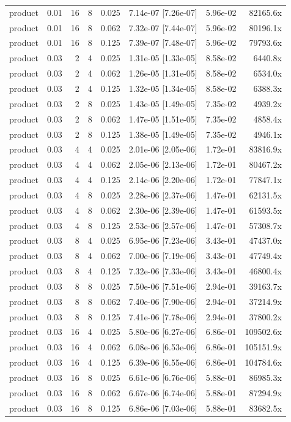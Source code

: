\begin{tabular}{lrrrrrrr}
product & 0.01 & 16 & 8 & 0.025 & 7.14e-07 [7.26e-07] & 5.96e-02 & 82165.6x \\
product & 0.01 & 16 & 8 & 0.062 & 7.32e-07 [7.44e-07] & 5.96e-02 & 80196.1x \\
product & 0.01 & 16 & 8 & 0.125 & 7.39e-07 [7.48e-07] & 5.96e-02 & 79793.6x \\
product & 0.03 & 2 & 4 & 0.025 & 1.31e-05 [1.33e-05] & 8.58e-02 & 6440.8x \\
product & 0.03 & 2 & 4 & 0.062 & 1.26e-05 [1.31e-05] & 8.58e-02 & 6534.0x \\
product & 0.03 & 2 & 4 & 0.125 & 1.32e-05 [1.34e-05] & 8.58e-02 & 6388.3x \\
product & 0.03 & 2 & 8 & 0.025 & 1.43e-05 [1.49e-05] & 7.35e-02 & 4939.2x \\
product & 0.03 & 2 & 8 & 0.062 & 1.47e-05 [1.51e-05] & 7.35e-02 & 4858.4x \\
product & 0.03 & 2 & 8 & 0.125 & 1.38e-05 [1.49e-05] & 7.35e-02 & 4946.1x \\
product & 0.03 & 4 & 4 & 0.025 & 2.01e-06 [2.05e-06] & 1.72e-01 & 83816.9x \\
product & 0.03 & 4 & 4 & 0.062 & 2.05e-06 [2.13e-06] & 1.72e-01 & 80467.2x \\
product & 0.03 & 4 & 4 & 0.125 & 2.14e-06 [2.20e-06] & 1.72e-01 & 77847.1x \\
product & 0.03 & 4 & 8 & 0.025 & 2.28e-06 [2.37e-06] & 1.47e-01 & 62131.5x \\
product & 0.03 & 4 & 8 & 0.062 & 2.30e-06 [2.39e-06] & 1.47e-01 & 61593.5x \\
product & 0.03 & 4 & 8 & 0.125 & 2.53e-06 [2.57e-06] & 1.47e-01 & 57308.7x \\
product & 0.03 & 8 & 4 & 0.025 & 6.95e-06 [7.23e-06] & 3.43e-01 & 47437.0x \\
product & 0.03 & 8 & 4 & 0.062 & 7.00e-06 [7.19e-06] & 3.43e-01 & 47749.4x \\
product & 0.03 & 8 & 4 & 0.125 & 7.32e-06 [7.33e-06] & 3.43e-01 & 46800.4x \\
product & 0.03 & 8 & 8 & 0.025 & 7.50e-06 [7.51e-06] & 2.94e-01 & 39163.7x \\
product & 0.03 & 8 & 8 & 0.062 & 7.40e-06 [7.90e-06] & 2.94e-01 & 37214.9x \\
product & 0.03 & 8 & 8 & 0.125 & 7.41e-06 [7.78e-06] & 2.94e-01 & 37800.2x \\
product & 0.03 & 16 & 4 & 0.025 & 5.80e-06 [6.27e-06] & 6.86e-01 & 109502.6x \\
product & 0.03 & 16 & 4 & 0.062 & 6.08e-06 [6.53e-06] & 6.86e-01 & 105151.9x \\
product & 0.03 & 16 & 4 & 0.125 & 6.39e-06 [6.55e-06] & 6.86e-01 & 104784.6x \\
product & 0.03 & 16 & 8 & 0.025 & 6.61e-06 [6.76e-06] & 5.88e-01 & 86985.3x \\
product & 0.03 & 16 & 8 & 0.062 & 6.67e-06 [6.74e-06] & 5.88e-01 & 87294.9x \\
product & 0.03 & 16 & 8 & 0.125 & 6.86e-06 [7.03e-06] & 5.88e-01 & 83682.5x \\
\bottomrule
\end{tabular}
